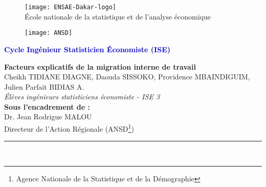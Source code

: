 \documentclass[a4paper,12pt]{article}
\begin{document}
		\begin{figure}[!h]
	    \begin{minipage}[c]{.30\linewidth}  
		\begin{center}
		\texttt{[image: ENSAE-Dakar-logo]}\\
		 {\scriptsize \'Ecole nationale de la statistique et de l'analyse économique}
        \end{center}
      
	    \end{minipage}
	    \hfill%
	    \hspace{20mm}
	    \begin{minipage}[c]{.36\linewidth}
		\begin{center}
	    \texttt{[image: ANSD]}
		\end{center}
	    \end{minipage}
	    \end{figure}


\begin{center}
\begin{center}

\thispagestyle{empty}

\textcolor{blue}{\textbf{Cycle Ingénieur Statisticien \'Economiste (ISE)}} 
\end{center}

\vspace{3mm}

\textbf{{\Large Facteurs explicatifs de la migration interne de travail}} \\

\vspace{4mm}
Cheikh TIDIANE DIAGNE, Daouda SISSOKO, Providence MBAINDIGUIM, Julien Parfait BIDIAS A.\\ \vspace{2mm} \emph{ Élèves ingénieurs statisticiens économiste - ISE 3} \\ \vspace{3mm}
\textbf{Sous l'encadrement de :} \\ \vspace{3mm}
Dr. Jean Rodrigue MALOU \\ \vspace{2mm} Directeur de l'Action Régionale (ANSD\footnote{Agence Nationale de la Statistique et de la Démographie})

\date{\today}
\end{center}

\rule{0.96\textwidth}{1pt}\\ \vspace{4mm}
\end{document}
